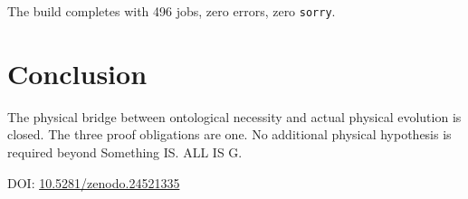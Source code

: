 \documentclass[12pt,a4paper]{article}
\begin{document}
The build completes with 496 jobs, zero errors, zero \texttt{sorry}.

\section{Conclusion}

The physical bridge between ontological necessity and actual physical
evolution is closed. The three proof obligations are one. No additional
physical hypothesis is required beyond Something IS. ALL IS G.

\medskip
\noindent DOI: \href{https://doi.org/10.5281/zenodo.24521335}{10.5281/zenodo.24521335}
\end{document}

